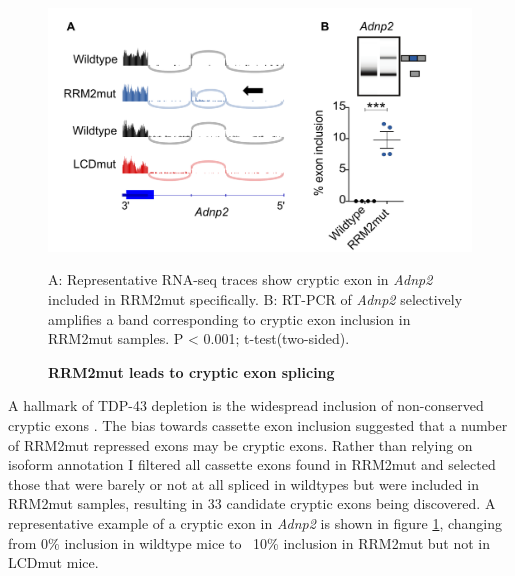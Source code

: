 \begin{figure}[h!]
	\centering
	\includegraphics[width=14cm]{Figures/05_tdp_mice/cryptic_exon_multi.png}
	\caption{\textbf{RRM2mut leads to cryptic exon splicing}}
	\label{cryptic_multi}
	A: Representative RNA-seq traces show cryptic exon in \textit{Adnp2} included in RRM2mut specifically. B: RT-PCR of \textit{Adnp2} selectively amplifies a band corresponding to cryptic exon inclusion in RRM2mut samples. P < 0.001; t-test(two-sided).
\end{figure}

A hallmark of TDP-43 depletion is the widespread inclusion of non-conserved cryptic exons \citep{Ling2015}. The bias towards cassette exon inclusion suggested that a number of RRM2mut repressed exons may be cryptic exons. Rather than relying on isoform annotation I filtered all cassette exons found in RRM2mut and selected those that were barely or not at all spliced in wildtypes but were included in RRM2mut samples, resulting in 33 candidate cryptic exons being discovered. A representative example of a cryptic exon in \textit{Adnp2} is shown in figure \ref{cryptic_multi}, changing from 0\% inclusion in wildtype mice to ~10\% inclusion in RRM2mut but not in LCDmut mice.  

